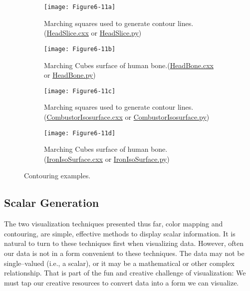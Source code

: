 \begin{figure}[htb]
	\begin{subfigure}[h]{0.48\linewidth}
		\texttt{[image: Figure6-11a]}
		\caption{Marching squares used to generate contour lines.(\href{https://lorensen.github.io/VTKExamples/site/Cxx/VisualizationAlgorithms/HeadSlice}{HeadSlice.cxx} or \href{https://lorensen.github.io/VTKExamples/site/Python/VisualizationAlgorithms/HeadSlice/}{HeadSlice.py})}\label{fig:Figure6-11a}
	\end{subfigure}
	\hfill
	\begin{subfigure}[h]{0.48\linewidth}
		\texttt{[image: Figure6-11b]}
		\caption{Marching Cubes surface of human bone.(\href{https://lorensen.github.io/VTKExamples/site/Cxx/VisualizationAlgorithms/HeadBone}{HeadBone.cxx} or \href{https://lorensen.github.io/VTKExamples/site/Python/VisualizationAlgorithms/HeadBone/}{HeadBone.py})}\label{fig:Figure6-11b}
	\end{subfigure}%
	\hfill
	\begin{subfigure}[h]{0.48\linewidth}
		\texttt{[image: Figure6-11c]}
		\caption{Marching squares used to generate contour lines.(\href{https://lorensen.github.io/VTKExamples/site/Cxx/VisualizationAlgorithms/CombustorIsosurface}{CombustorIsosurface.cxx} or \href{https://lorensen.github.io/VTKExamples/site/Python/VisualizationAlgorithms/CombustorIsosurface/}{CombustorIsosurface.py})}\label{fig:Figure6-11c}
	\end{subfigure}
	\hfill
	\begin{subfigure}[h]{0.48\linewidth}
		\texttt{[image: Figure6-11d]}
		\caption{Marching Cubes surface of human bone.(\href{https://lorensen.github.io/VTKExamples/site/Cxx/VisualizationAlgorithms/IronIsoSurface}{IronIsoSurface.cxx} or \href{https://lorensen.github.io/VTKExamples/site/Python/VisualizationAlgorithms/IronIsoSurface/}{IronIsoSurface.py})}\label{fig:Figure6-11d}
	\end{subfigure}%
	\caption{Contouring examples.}\label{fig:Figure6-11}
\end{figure}

\subsection{Scalar Generation}
\label{subsec:scalar_generation}

The two visualization techniques presented thus far, color mapping and contouring, are simple, effective methods to display scalar information. It is natural to turn to these techniques first when visualizing data. However, often our data is not in a form convenient to these techniques. The data may not be single--valued (i.e., a scalar), or it may be a mathematical or other complex relationship. That is part of the fun and creative challenge of visualization: We must tap our creative resources to convert data into a form we can visualize.

